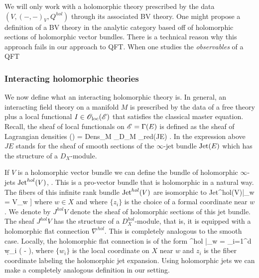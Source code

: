 \begin{rmk} 
We will only work with a holomorphic theory prescribed by the data $(V, (-,-)_V, Q^{hol})$ through its associated BV theory.
One might propose a definition of a BV theory in the analytic category based off of holomorphic sections of holomorphic vector bundles. 
There is a technical reason why this approach fails in our approach to QFT. 
When one studies the {\em observables} of a QFT 
\end{rmk}

\subsubsection{Interacting holomorphic theories}

\def\olochol{\sO_{\rm loc}^{hol}}

We now define what an interacting holomorphic theory is.
In general, an interacting field theory on a manifold $M$ is prescribed by the data of a free theory plus a local functional $I \in {\mathscr O}_{\rm loc}(\mathscr E)$ that satisfies the classical master equation. 
Recall, the sheaf of local functionals on $\mathscr E = \Gamma(E)$ is defined as the sheaf of Lagrangian densities
\ben
\oloc(\sE) = {\rm Dens}_M \tensor_{D_M} \sO_{red}(JE) .
\een
In the expression above $JE$ stands for the sheaf of smooth sections of the $\infty$-jet bundle ${\rm Jet}(E)$ which has the structure of a $D_X$-module.

If $V$ is a holomorphic vector bundle we can define the bundle of holomorphic $\infty$-jets ${\rm Jet}^{hol}(V)$, \cite{GriffithsGreen, WongChandler}. 
This is a pro-vector bundle that is holomorphic in a natural way.
The fibers of this infinite rank bundle ${\rm Jet}^{hol}(V)$ are isomorphic to 
\ben
{\rm Jet}^{hol}(V)|_w = V_w \tensor \CC[[z_1,\ldots,z_d]] 
\een
where $w \in X$ and where $\{z_i\}$ is the choice of a formal coordinate near $w$. 
We denote by $J^{hol} V$ denote the sheaf of holomorphic sections of this jet bundle.
The sheaf $J^{hol}V$ has the structure of a $D_X^{hol}$-module, that is, it is equipped with a holomorphic flat connection $\nabla^{hol}$.
This is completely analogous to the smooth case.
Locally, the holomorphic flat connection is of the form
\ben
\nabla^{hol} |_w = \sum_{i=1}^d \d w_i \left( - \right),
\een
where $\{w_i\}$ is the local coordinate on $X$ near $w$ and $z_i$ is the fiber coordinate labeling the holomorphic jet expansion.
Using holomorphic jets we can make a completely analogous definition in our setting.

